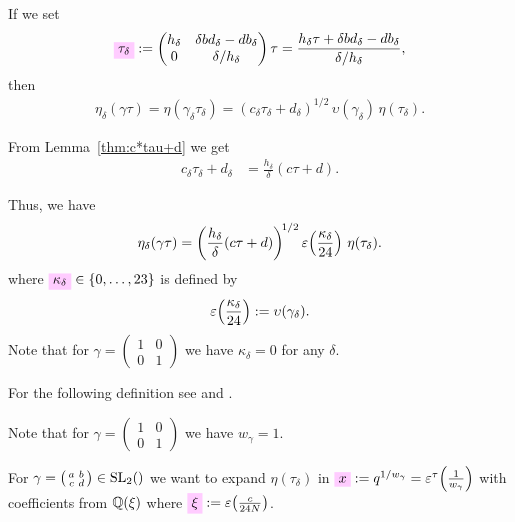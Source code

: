 \documentclass{article}
\begin{document}
\begin{Hemmecke}
If we set
\begin{gather}
  \defineNotation[tau-delta]{\tau_\delta}
  :=
  \begin{pmatrix}
    h_\delta & \delta b d_\delta-d b_\delta\\
    0       & \delta / h_\delta
  \end{pmatrix} \tau
  =
  \frac{h_\delta\tau+\delta b d_\delta-d b_\delta}{\delta/h_\delta},
  \label{eq:tau_delta}
\end{gather}
then
\begin{gather*}
  \eta_\delta(\gamma\tau)
  =
  \eta(\gamma_\delta \tau_\delta)
  =
  (c_\delta\tau_\delta+d_\delta)^{1/2}
  \,
  \upsilon(\gamma_\delta)
  \,
  \eta(\tau_\delta).
\end{gather*}


From Lemma~\ref{thm:c*tau+d} we get
\begin{align*}
  c_\delta\tau_\delta+d_\delta
  &=
  \frac{h_\delta}{\delta}(c \tau + d).
\end{align*}

Thus, we have
\begin{gather}
\eta_\delta(\gamma\tau)
=
\left(\frac{h_\delta}{\delta}(c \tau+d)\right)^{\!1/2}
\varepsilon\!\left(\frac{\kappa_\delta}{24}\right)
\,
\eta(\tau_\delta).
\label{eq:eta_delta(gamma*tau)}
\end{gather}
where
$\defineNotation[kappa-delta]{\kappa_\delta} \in \Set{0,\ldots,23}$ is
defined by
\begin{gather}
  \label{eq:kappa_delta}
  \varepsilon\!\left(\frac{\kappa_\delta}{24}\right) := \upsilon(\gamma_\delta).
\end{gather}
Note that for
$\gamma=\left(\begin{smallmatrix}1&0\\0&1\end{smallmatrix}\right)$ we
have $\kappa_\delta=0$ for any $\delta$.


For the following definition see \cite[Lemma~2.37]{Radu_PhD_2010} and
\cite[Definition~2.9]{Radu_PhD_2010}.


Note that for
$\gamma=\left(\begin{smallmatrix}1&0\\0&1\end{smallmatrix}\right)$ we
have $w_\gamma=1$.


For
$\gamma =
\bigl(
\begin{smallmatrix}
  a & b\\
  c & d
\end{smallmatrix}
\bigr) \in \SL2Z$ we want to expand $\eta(\tau_\delta)$ in
$\defineNotation[x]{x}:=q^{1/w_\gamma}=\unityPowerTau{\frac{1}{w_\gamma}}$
with coefficients from $\mathbb{Q}(\xi)$ where
$\defineNotation[xi]{\xi} := \unityPower{\frac{c}{24N}}$.


\end{Hemmecke}
\end{document}
